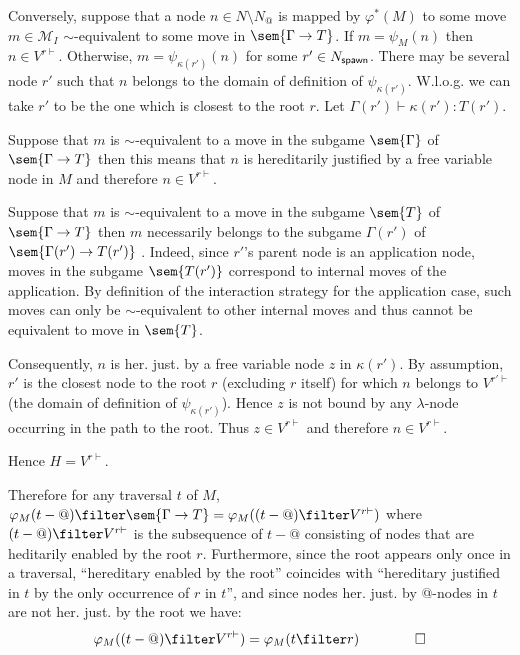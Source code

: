 Conversely, suppose that a node $n \in N\setminus N_@$ is mapped by $\varphi^*(M)$ 
to some move $m\in \mathcal{M}_I$ $\sim$-equivalent to some move in $\sem{\Gamma \rightarrow T}$.
 If $m = \psi_M(n)$ then $n\in V^{r\vdash}$. Otherwise,
$m = \psi_{\kappa(r')}(n)$ for some $r' \in N_{\sf spawn}$. 
There may be several node $r'$ such that $n$ belongs to the domain of definition of
$\psi_{\kappa(r')}$. W.l.o.g. we can take $r'$ to be the one which is closest to the root $r$.
Let $\Gamma(r') \vdash  \kappa(r') : T(r')$.
    \begin{compactitem}
    \item Suppose that $m$ is $\sim$-equivalent to a move in the subgame $\sem{\Gamma}$ of $\sem{\Gamma \rightarrow T}$
    then this means that $n$ is hereditarily justified by a free variable node in $M$ and therefore $n \in V^{r\vdash}$.

    \item Suppose that $m$ is $\sim$-equivalent to a move in the subgame $\sem{T}$ of $\sem{\Gamma \rightarrow T}$
    then $m$ necessarily belongs to the subgame $\Gamma(r')$ of $\sem{\Gamma(r')\rightarrow T(r')}$ .
    Indeed, since $r'$'s parent node is an application node, moves in the subgame
    $\sem{T(r')}$ correspond to internal moves of the application. By definition of
    the interaction strategy for the application case, such moves can only be $\sim$-equivalent to other internal
    moves and thus cannot be equivalent to move in $\sem{T}$.

    Consequently, $n$ is her. just. by a free variable node $z$ in $\kappa(r')$. By assumption, $r'$ is the closest node to the root $r$ (excluding $r$ itself) for which $n$ belongs to $V^{r'\vdash}$ (the domain of definition of $\psi_{\kappa(r')}$). Hence $z$ is not bound by any $\lambda$-node occurring in the path to the root. Thus $z\in 
    V^{r\vdash}$ and therefore $n \in V^{r\vdash}$.
    \end{compactitem}
Hence $H = V^{r\vdash}$.

Therefore for any traversal $t$ of $M$,
$\varphi_M(t-@) \filter \sem{\Gamma \rightarrow T} = 
\varphi_M((t-@)\filter V^{r\vdash})$
where $(t-@)\filter V^{r\vdash}$ is the subsequence of $t-@$ consisting of nodes that are heditarily enabled
by the root $r$. Furthermore, since the root appears only once in a traversal, ``hereditary enabled by the root'' coincides with ``hereditary justified in $t$ by the only occurrence of $r$ in $t$'', and since nodes her. just. by @-nodes in $t$ are not her. just. by the root we have:
$$\varphi_M((t-@)\filter V^{r\vdash}) = \varphi_M(t\filter r) \qquad \qed$$


